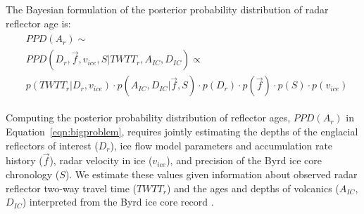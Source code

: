 The Bayesian formulation of the posterior probability distribution of radar reflector age is:
\begin{equation}\label{eqn:bigproblem}
\begin{split} %
\begin{aligned}
& PPD(A_r)  \sim   \\
&PPD(D_r,\vec{f},v_{ice},S | TWTT_r,A_{IC},D_{IC})  \propto  \\
&        p(TWTT_r | D_r,v_{ice}) \cdot p(A_{IC},D_{IC} | \vec{f},S)  \cdot p(D_r) \cdot p(\vec{f}) \cdot p(S) \cdot p(v_{ice})
\end{aligned}
\end{split}
\end{equation}

Computing the posterior probability distribution of reflector ages, $PPD(A_r)$ in Equation~\ref{eqn:bigproblem}, requires jointly estimating the depths of the englacial reflectors of interest ($D_r$), ice flow model parameters and accumulation rate history ($\vec{f}$), radar velocity in ice ($v_{ice}$), and precision of the Byrd ice core chronology ($S$). We estimate these values given information about observed radar reflector two-way travel time ($TWTT_r$) and the ages and depths of volcanics ($A_{IC}$, $D_{IC}$) interpreted from the Byrd ice core record \citep{hammer1997}.


